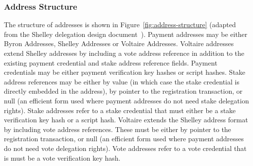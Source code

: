 \subsubsection*{Address Structure}

The structure of addresses is shown in Figure~\ref{fig:address-structure} (adapted from the Shelley delegation design document~\cite{..}).
Payment addresses may be either Byron Addresses, Shelley Addresses or Voltaire Addresses.
Voltaire addresses extend Shelley addresses by including a vote address reference in addition to the existing payment credential and stake address
reference fields.  Payment credentials may be either payment verification key hashes or script hashes.  Stake address references may be either
by value (in which case the stake credential is directly embedded in the address), by pointer to the registration transaction, or null (an efficient
form used where payment addresses do not need stake delegation rights).
Stake addresses refer to a stake credential that must either be a stake verification key hash or a script hash.
Voltaire extends the Shelley address format by including vote address references.  These must be either by pointer to the registration transaction, or null (an efficient
form used where payment addresses do not need vote delegation rights).
Vote addresses refer to a vote credential that is must be a vote verification key hash.
